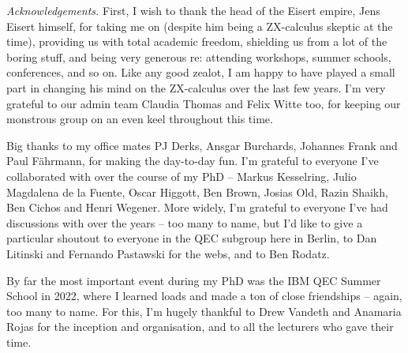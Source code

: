 \pagebreak

\textit{Acknowledgements.} First, I wish to thank the head of the Eisert empire, Jens Eisert himself, for taking me on (despite him being a ZX-calculus skeptic at the time), providing us with total academic freedom, shielding us from a lot of the boring stuff, and being very generous re: attending workshops, summer schools, conferences, and so on.
Like any good zealot, I am happy to have played a small part in changing his mind on the ZX-calculus over the last few years.
I'm very grateful to our admin team Claudia Thomas and Felix Witte too, for keeping our monstrous group on an even keel throughout this time.

Big thanks to my office mates PJ Derks, Ansgar Burchards, Johannes Frank and Paul Fährmann, for making the day-to-day fun.
I'm grateful to everyone I've collaborated with over the course of my PhD -- Markus Kesselring, Julio Magdalena de la Fuente, Oscar Higgott, Ben Brown, Josias Old, Razin Shaikh, Ben Cichos and Henri Wegener.
More widely, I'm grateful to everyone I've had discussions with over the years -- too many to name, but I'd like to give a particular shoutout to everyone in the QEC subgroup here in Berlin, to Dan Litinski and Fernando Pastawski for the webs, and to Ben Rodatz.

By far the most important event during my PhD was the IBM QEC Summer School in 2022, where I learned loads and made a ton of close friendships -- again, too many to name.
For this, I'm hugely thankful to Drew Vandeth and Anamaria Rojas for the inception and organisation, and to all the lecturers who gave their time.
